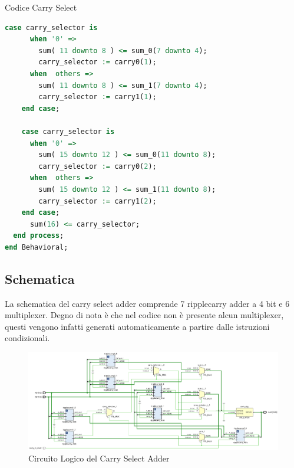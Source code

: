 \begin{problem}{Codice Carry Select}{}
\begin{lstlisting}[language=VHDL]
    case carry_selector is
      when '0' =>
        sum( 11 downto 8 ) <= sum_0(7 downto 4);
        carry_selector := carry0(1);
      when  others =>
        sum( 11 downto 8 ) <= sum_1(7 downto 4);
        carry_selector := carry1(1);
    end case;

    case carry_selector is
      when '0' =>
        sum( 15 downto 12 ) <= sum_0(11 downto 8);
        carry_selector := carry0(2);
      when  others =>
        sum( 15 downto 12 ) <= sum_1(11 downto 8);
        carry_selector := carry1(2);
    end case;
      sum(16) <= carry_selector;
  end process;
end Behavioral;
\end{lstlisting}
\end{problem}
\subsection{Schematica}
La schematica del carry select adder comprende 7 ripplecarry adder a 4 bit e 6 multiplexer.
Degno di nota è che nel codice non è presente alcun multiplexer, questi vengono infatti generati automaticamente a partire dalle istruzioni condizionali.
\begin{figure}[H]
    \centering
    \includegraphics[width=15cm]{resources/carry_select_schematics.png}
    \caption{Circuito Logico del Carry Select Adder}
    \label{fig:logic_circuit_carry_select_adder}
\end{figure}
